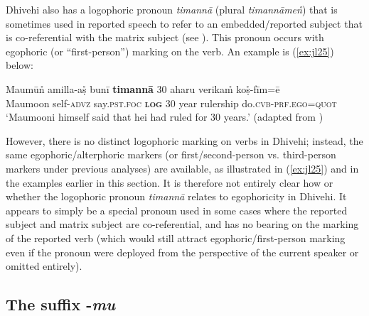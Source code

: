\documentclass[output=paper]{langsci/langscibook}
\begin{document}

   Dhivehi also has a logophoric pronoun \textit{timannā} (plural \textit{timannāmen̊}) that is sometimes used in reported speech to refer to an embedded/reported subject that is co-referential with the matrix subject (see \citealt[96–97]{Gnanadesikan2017}). This pronoun occurs with egophoric (or “first-person”) marking on the verb. An example is (\ref{ex:jl25}) below:

\begin{exe}
	\ex 	\label{ex:jl25}
	\gll Maumūn̊ amilla-aṣ̊ bunī \textbf{timannā} 30 aharu verikam̊ koṣ̊-fīm=ē\\
	Maumoon self-\textsc{advz} say.\textsc{pst}.\textsc{foc} \textbf{\textsc{log}} 30 year rulership do.\textsc{cvb}-\textsc{prf}.\textsc{ego}=\textsc{quot}\\
	\trans ‘Maumooni himself said that hei had ruled for 30 years.’ (adapted from \citealt[96]{Gnanadesikan2017})
\end{exe}


However, there is no distinct logophoric marking on verbs in Dhivehi; instead, the same egophoric/alterphoric markers (or first/second-person vs. third-person markers under previous analyses) are available, as illustrated in (\ref{ex:jl25}) and in the examples earlier in this section. It is therefore not entirely clear how or whether the logophoric pronoun \textit{timannā} relates to egophoricity in Dhivehi. It appears to simply be a special pronoun used in some cases where the reported subject and matrix subject are co-referential, and has no bearing on the marking of the reported verb (which would still attract egophoric/first-person marking even if the pronoun were deployed from the perspective of the current speaker or omitted entirely).


\subsection{The suffix -\textit{mu}}\label{s:jl3-4}
\end{document}
